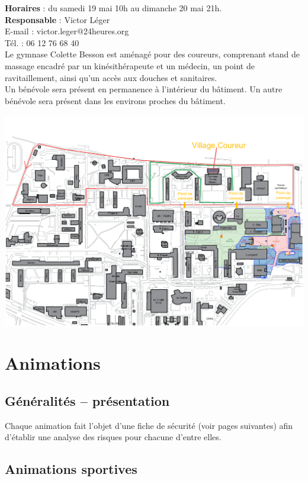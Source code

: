 \documentclass[hidelinks, paper=a4, fontsize=13pt]{report}
\begin{document}
\textbf{Horaires} : du samedi 19 mai 10h au dimanche 20 mai 21h.\\

\textbf{Responsable} :  Victor Léger\\
	E-mail : victor.leger@24heures.org\\
	Tél. : 06 12 76 68 40\\

Le gymnase Colette Besson est aménagé pour des coureurs, comprenant stand de massage encadré par un kinésithérapeute et un médecin, un point de ravitaillement, ainsi qu’un accès aux douches et sanitaires.\\

Un bénévole sera présent en permanence à l’intérieur du bâtiment. Un autre bénévole sera présent dans les environs proches du bâtiment. \\

\begin{center}
\includegraphics[width=.8\textwidth,keepaspectratio]{Exports/Plan_24h_44eme-Parcours_courses}
\end{center}
\newpage
\section{Animations}
\subsection{Généralités – présentation}


Chaque animation fait l’objet d’une fiche de sécurité (voir pages suivantes) afin d’établir une analyse des risques pour chacune d’entre elles.

\subsection{Animations sportives}
\end{document}

